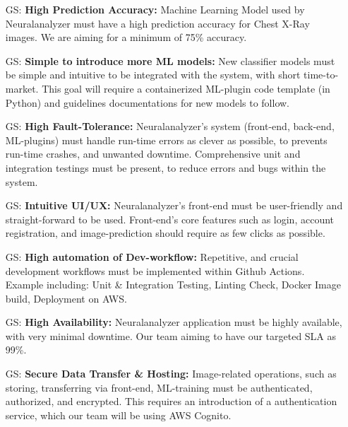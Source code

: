 \documentclass[12pt]{article}
\newcounter{goalnum} %
\begin{document}
\begin{itemize}

\item[GS\refstepcounter{goalnum}\thegoalnum \label{G_prediction_accuracy}:] \textbf{High Prediction Accuracy: }Machine Learning Model used by Neuralanalyzer must have a high prediction accuracy for Chest X-Ray images. We are aiming for a minimum of 75\% accuracy.
\item[GS\refstepcounter{goalnum}\thegoalnum \label{G_ease_of_ML_intro}:] \textbf{Simple to introduce more ML models: }New classifier models must be simple and intuitive to be integrated with the system, with short time-to-market. This goal will require a containerized ML-plugin code template (in Python) and guidelines documentations for new models to follow.
\item[GS\refstepcounter{goalnum}\thegoalnum \label{G_fault-tolerance}:] \textbf{High Fault-Tolerance: }Neuralanalyzer's system (front-end, back-end, ML-plugins) must handle run-time errors as clever as possible, to prevents run-time crashes, and unwanted downtime. Comprehensive unit and integration testings must be present, to reduce errors and bugs within the system.
\item[GS\refstepcounter{goalnum}\thegoalnum \label{G_good_UI}:] \textbf{Intuitive UI/UX: }Neuralanalyzer's front-end must be user-friendly and straight-forward to be used. Front-end's core features such as login, account registration, and image-prediction should require as few clicks as possible.
\item[GS\refstepcounter{goalnum}\thegoalnum \label{G_dev_work_automation}:] \textbf{High automation of Dev-workflow: }Repetitive, and crucial development workflows must be implemented within Github Actions. Example including: Unit \& Integration Testing, Linting Check, Docker Image build, Deployment on AWS.
\item[GS\refstepcounter{goalnum}\thegoalnum \label{G_avaialblity}:] \textbf{High Availability: }Neuralanalyzer application must be highly available, with very minimal downtime. Our team aiming to have our targeted SLA as 99\%.
\item[GS\refstepcounter{goalnum}\thegoalnum \label{G_data_security}:] \textbf{Secure Data Transfer \& Hosting: }Image-related operations, such as storing, transferring via front-end, ML-training must be authenticated, authorized, and encrypted. This requires an introduction of a authentication service, which our team will be using AWS Cognito.

\end{itemize}
\newpage
\end{document}
